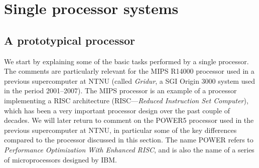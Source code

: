 \chapter{Single processor systems}

\section{A prototypical processor}

We start by explaining some of the basic tasks performed by a single processor.
The comments are particularly relevant for the MIPS R14000 processor used in a
previous supercomputer at NTNU (called \emph{Gridur}, a SGI Origin 3000 system
used in the period 2001--2007). The MIPS processor is an example of a processor
implementing a RISC architecture (RISC---\emph{Reduced Instruction Set
Computer}), which has been a very important processor design over the past
couple of decades. We will later return to comment on the POWER5 processor
used in the previous supercomputer at NTNU, in particular some of the key
differences compared to the processor discussed in this section. The name POWER
refers to \emph{Performance Optimization With Enhanced RISC}, and is also the
name of a series of microprocessors designed by IBM.

